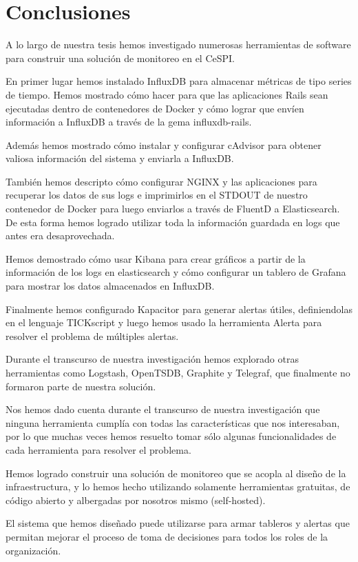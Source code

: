 \newpage
\section{Conclusiones}
\label{conclusiones}

A lo largo de nuestra tesis hemos investigado numerosas herramientas de software para construir una solución de monitoreo en el CeSPI.

En primer lugar hemos instalado InfluxDB para almacenar métricas de tipo series de tiempo. Hemos mostrado cómo hacer para que las aplicaciones Rails sean ejecutadas dentro de contenedores de Docker y cómo lograr que envíen información a InfluxDB a través de la gema influxdb-rails.

Además hemos mostrado cómo instalar y configurar cAdvisor para obtener valiosa información del sistema y enviarla a InfluxDB.

También hemos descripto cómo configurar NGINX y las aplicaciones para recuperar los datos de sus logs e imprimirlos en el STDOUT de nuestro contenedor de Docker para luego enviarlos a través de FluentD a Elasticsearch. De esta forma hemos logrado utilizar toda la información guardada en logs que antes era desaprovechada.

Hemos demostrado cómo usar Kibana para crear gráficos a partir de la información de los logs en elasticsearch y cómo configurar un tablero de Grafana para mostrar los datos almacenados en InfluxDB.

Finalmente hemos configurado Kapacitor para generar alertas útiles, definiendolas en el lenguaje TICKscript y luego hemos usado la herramienta Alerta para resolver el problema de múltiples alertas.

Durante el transcurso de nuestra investigación hemos explorado otras herramientas como Logstash, OpenTSDB, Graphite y Telegraf, que finalmente no formaron parte de nuestra solución.

Nos hemos dado cuenta durante el transcurso de nuestra investigación que ninguna herramienta cumplía con todas las características que nos interesaban, por lo que muchas veces hemos resuelto tomar sólo algunas funcionalidades de cada herramienta para resolver el problema.

Hemos logrado construir una solución de monitoreo que se acopla al diseño de la infraestructura, y lo hemos hecho utilizando solamente herramientas gratuitas, de código abierto y albergadas por nosotros mismo (self-hosted).

El sistema que hemos diseñado puede utilizarse para armar tableros y alertas que permitan mejorar el proceso de toma de decisiones para todos los roles de la organización.

